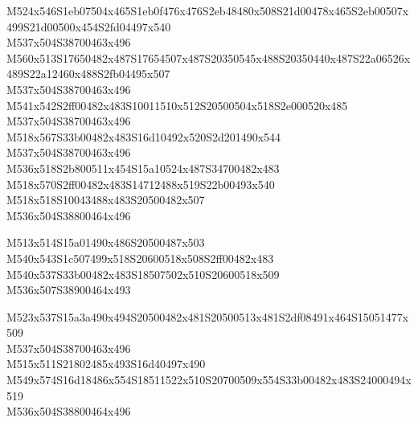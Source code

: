 \documentclass{article}
\begin{document}
\begin{multicols}{5}
\begin{center}
M524x546S1eb07504x465S1eb0f476x476S2eb48480x508S21d00478x465S2eb00507x499S21d00500x454S2fd04497x540 %
\\M537x504S38700463x496 %
\\M560x513S17650482x487S17654507x487S20350545x488S20350440x487S22a06526x489S22a12460x488S2fb04495x507 %
\\M537x504S38700463x496 %
\\M541x542S2ff00482x483S10011510x512S20500504x518S2e000520x485 %
\\M537x504S38700463x496 %
\\M518x567S33b00482x483S16d10492x520S2d201490x544 %
\\M537x504S38700463x496 %
\\M536x518S2b800511x454S15a10524x487S34700482x483 %
\\M518x570S2ff00482x483S14712488x519S22b00493x540 %
\\M518x518S10043488x483S20500482x507 %
\\M536x504S38800464x496 %

M513x514S15a01490x486S20500487x503 %
\\M540x543S1c507499x518S20600518x508S2ff00482x483 %
\\M540x537S33b00482x483S18507502x510S20600518x509 %
\\M536x507S38900464x493 %

M523x537S15a3a490x494S20500482x481S20500513x481S2df08491x464S15051477x509 %
\\M537x504S38700463x496 %
\\M515x511S21802485x493S16d40497x490 %
\\M549x574S16d18486x554S18511522x510S20700509x554S33b00482x483S24000494x519 %
\\M536x504S38800464x496 %

\end{center}
\end{multicols}
\end{document}
